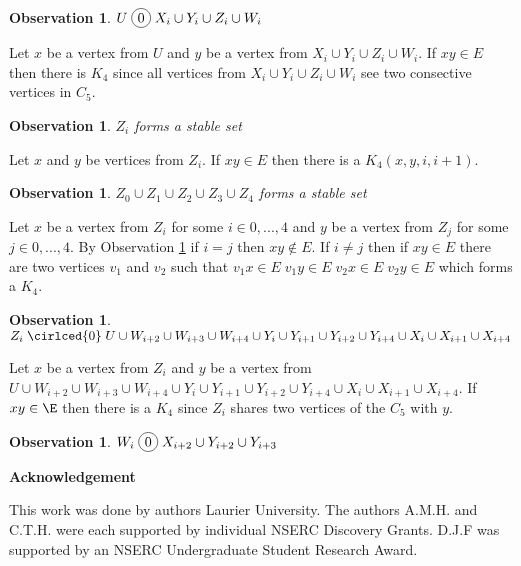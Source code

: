 \documentclass[12pt]{article}
\newcommand*\circled[1]{\tikz[baseline=(char.base)]{
            \node[shape=circle,draw,inner sep=2pt] (char) {#1};}}
\newtheorem{Observation}[Theorem]{Observation}
\begin{document}
\begin{Observation}\label{obs:U-co-joins}
$U \;\circled{0}\; X_i \cup Y_i \cup Z_i \cup W_i$
\end{Observation}
 Let $x$ be a vertex from $U$ and $y$ be a vertex from $X_i \cup Y_i \cup Z_i \cup W_i$. If $xy \in E$ then there is $K_4$ since all vertices from $X_i \cup Y_i \cup Z_i \cup W_i$ see two consective vertices in $C_5$.

\begin{Observation}\label{obs:Zi-stable}
$Z_i$ forms a stable set
\end{Observation}
 Let $x$ and $y$ be vertices from $Z_i$. If $xy \in E$ then there is a $K_4(x, y, i, i+1)$.

\begin{Observation}\label{obs:all-zi-stable}
$Z_0 \cup Z_1 \cup Z_2 \cup Z_3 \cup Z_4$ forms a stable set
\end{Observation}
 Let $x$ be a vertex from $Z_i$ for some $i \in {0,...,4}$ and $y$ be a vertex from $Z_j$ for some $j \in {0,...,4}$. By Observation \ref{obs:Zi-stable} if $i = j$ then $xy \not \in E$. If $i \neq j$ then if $xy \in E$ there are two vertices $v_1$ and $v_2$ such that $v_1x \in E\; v_1y \in E\; v_2x \in E\; v_2y \in E$ which forms a $K_4$.

\begin{Observation}\label{obs:zi-co-joins}
$Z_i \;\cirlced{0}\; U \cup W_{i+2} \cup W_{i+3} \cup W_{i+4} \cup Y_{i} \cup Y_{i+1} \cup Y_{i+2} \cup Y_{i+4} \cup X_{i} \cup X_{i+1} \cup X_{i+4} $
\end{Observation}
 Let $x$ be a vertex from $Z_i$ and $y$ be a vertex from $U \cup W_{i+2} \cup W_{i+3} \cup W_{i+4} \cup Y_{i} \cup Y_{i+1} \cup Y_{i+2} \cup Y_{i+4} \cup X_{i} \cup X_{i+1} \cup X_{i+4}$. If $xy \in \E$ then there is a $K_4$ since $Z_i$ shares two vertices of the $C_5$ with $y$. 

\begin{Observation}\label{obs:wi-co-joins}
$W_i \;\circled{0}\; X_{i+2} \cup Y_{i+2} \cup Y_{i+3}$
\end{Observation}

\begin{center}
{\bf Acknowledgement}
\end{center}
This work was done by authors  Laurier University. The authors A.M.H. and C.T.H. were each supported by individual NSERC Discovery Grants. D.J.F was supported by an NSERC Undergraduate Student Research Award.


\clearpage
\begin{thebibliography}{99}

\end{thebibliography}
\end{document}
